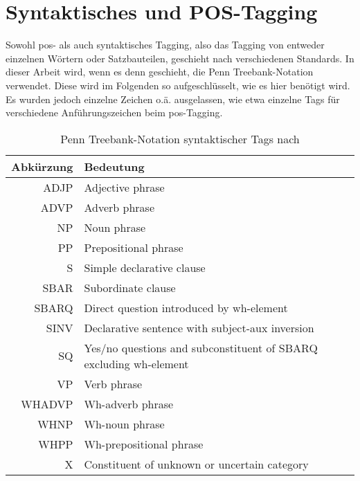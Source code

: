 \chapter{Syntaktisches und POS-Tagging}\label{ch:tagging}

Sowohl \ac{pos}- als auch syntaktisches Tagging, also das Tagging von entweder einzelnen Wörtern oder Satzbauteilen, geschieht nach verschiedenen Standards.
In dieser Arbeit wird, wenn es denn geschieht, die Penn Treebank-Notation verwendet.
Diese wird im Folgenden so aufgeschlüsselt, wie es hier benötigt wird.
Es wurden jedoch einzelne Zeichen o.ä. ausgelassen, wie etwa einzelne Tags für verschiedene Anführungszeichen beim \ac{pos}-Tagging.

\begin{table}[h]\centering
  \begin{tabular}{ r l}
    \toprule
    Abkürzung & Bedeutung \\
    \midrule
    ADJP & Adjective phrase \\
    ADVP & Adverb phrase \\
    NP & Noun phrase \\
    PP & Prepositional phrase \\
    S & Simple declarative clause \\
    SBAR & Subordinate clause \\
    SBARQ & Direct question introduced by wh-element \\
    SINV & Declarative sentence with subject-aux inversion \\
    SQ & Yes/no questions and subconstituent of SBARQ excluding wh-element \\
    VP & Verb phrase \\
    WHADVP & Wh-adverb phrase \\
    WHNP & Wh-noun phrase \\
    WHPP & Wh-prepositional phrase \\
    X & Constituent of unknown or uncertain category \\
    \bottomrule
  \end{tabular}
  \caption[Penn Treebank-Notation syntaktischer Tags]{Penn Treebank-Notation syntaktischer Tags nach \citet{penntreebankpos}}
  \label{tab:penntreebanksynt}
\end{table}


